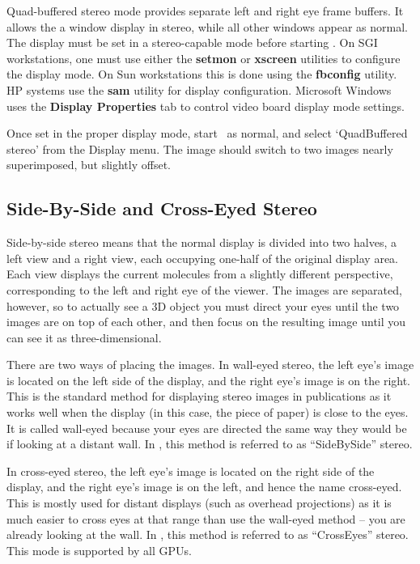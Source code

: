 Quad-buffered stereo mode provides separate left and right eye frame buffers.
It allows the a window display in stereo, while all
other windows appear as normal.
The display must be set in a stereo-capable mode before starting
\VMD.  On SGI workstations, one must use either the {\bf setmon} or 
{\bf xscreen} utilities to configure the display mode.  On Sun workstations
this is done using the {\bf fbconfig} utility.  HP systems use the
{\bf sam} utility for display configuration.  Microsoft Windows uses
the {\bf Display Properties} tab to control video board display mode
settings.

Once set in the proper display mode, start \VMD\ as normal, and select
`QuadBuffered stereo' from the Display menu.  The image
should switch to two images nearly superimposed, but slightly offset.

\subsection{Side-By-Side and Cross-Eyed Stereo}
Side-by-side stereo means that the normal display is divided into two
halves, a left view and a right view, each occupying one-half of the
original display area.  Each view displays the current molecules from
a slightly different perspective, corresponding to the left and right
eye of the viewer.  The images are separated, however, so to actually
see a 3D object you must direct your eyes until the two images are on
top of each other, and then focus on the resulting image until you can
see it as three-dimensional.

There are two ways of placing the images.  In wall-eyed stereo, the
left eye's image is located on the left side of the display, and the
right eye's image is on the right.  This is the standard method for
displaying stereo images in publications as it works well when the
display (in this case, the piece of paper) is close to the eyes.  It
is called wall-eyed because your eyes are directed the same way they
would be if looking at a distant wall.  In \VMD, this method is
referred to as ``SideBySide'' stereo.

In cross-eyed stereo, the left eye's image is located on the right
side of the display, and the right eye's image is on the left, and
hence the name cross-eyed.  This is mostly used for distant displays
(such as overhead projections) as it is much easier to cross eyes at
that range than use the wall-eyed method -- you are already looking at
the wall.  In \VMD, this method is referred to as ``CrossEyes'' stereo.
This mode is supported by all GPUs.

